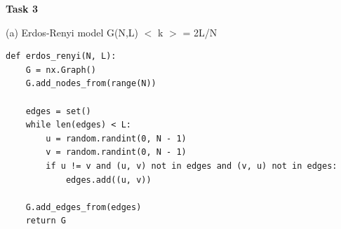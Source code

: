 \documentclass[10pt,letterpaper, onecolumn]{report}
\begin{document}
\clearpage

\begin{flushleft}
    \textbf{Task 3}
    \hfill\break
    \setlength{\parindent}{1.5em} %
    \setlength{\parskip}{0.5em}   %


    (a) Erdos-Renyi model G(N,L) $<$ k $>$ = 2L/N

    \begin{lstlisting}[style=myPythonStyle, caption={Erdos-Renyi model}]
def erdos_renyi(N, L):
    G = nx.Graph()
    G.add_nodes_from(range(N))

    edges = set()
    while len(edges) < L:
        u = random.randint(0, N - 1)
        v = random.randint(0, N - 1)
        if u != v and (u, v) not in edges and (v, u) not in edges:
            edges.add((u, v))

    G.add_edges_from(edges)
    return G

    \end{lstlisting}


\end{flushleft}
\end{document}
